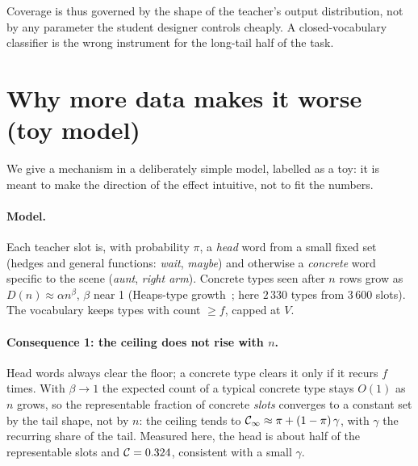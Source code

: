 Coverage is thus governed by the shape of the teacher's output distribution,
not by any parameter the student designer controls cheaply. A closed-vocabulary
classifier is the wrong instrument for the long-tail half of the task.

\section{Why more data makes it worse (toy model)}
\label{sec:model}
We give a mechanism in a deliberately simple model, labelled as a toy: it is
meant to make the direction of the effect intuitive, not to fit the numbers.

\paragraph{Model.} Each teacher slot is, with probability $\pi$, a
\emph{head} word from a small fixed set (hedges and general functions:
\emph{wait}, \emph{maybe}) and otherwise a \emph{concrete} word specific to the
scene (\emph{aunt}, \emph{right arm}). Concrete types seen after $n$ rows grow
as $D(n)\approx\alpha n^{\beta}$, $\beta$ near 1 (Heaps-type
growth~\citep{heaps1978}; here $2\,330$ types from $3\,600$ slots). The
vocabulary keeps types with count $\ge f$, capped at $V$.

\paragraph{Consequence 1: the ceiling does not rise with $n$.} Head words
always clear the floor; a concrete type clears it only if it recurs $f$ times.
With $\beta\to1$ the expected count of a typical concrete type stays $O(1)$ as
$n$ grows, so the representable fraction of concrete \emph{slots} converges to
a constant set by the tail shape, not by $n$: the ceiling tends to
$\mathcal{C}_\infty\approx\pi+(1-\pi)\,\gamma$, with $\gamma$ the recurring share of
the tail. Measured here, the head is about half of the representable slots and
$\mathcal{C}=0.324$, consistent with a small $\gamma$.


